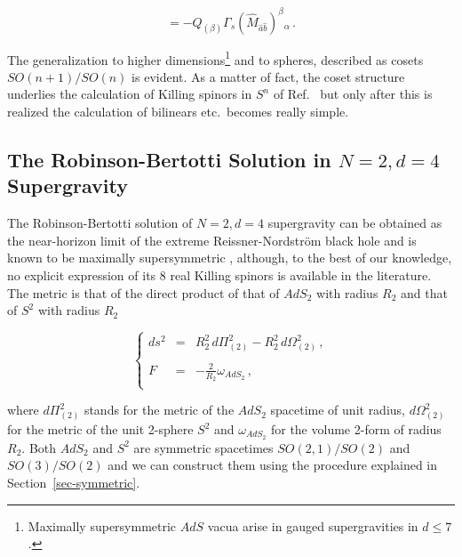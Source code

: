 \documentclass[12pt,a4paper]{article}
\begin{document}
\begin{equation}
[Q_{(\alpha)},\hat{M}_{\hat{a}\hat{b}}] = 
-Q_{(\beta)}\Gamma_{s}(\hat{M}_{\hat{a}\hat{b}})^{\beta}{}_{\alpha}\, .  
\end{equation}

The generalization to higher dimensions\footnote{Maximally
  supersymmetric $AdS$ vacua arise in gauged supergravities in $d\leq
  7$.} and to spheres, described as cosets $SO(n+1)/SO(n)$ is evident.
As a matter of fact, the coset structure underlies the calculation of
Killing spinors in $S^{n}$ of Ref.~\cite{Lu:1998nu} but only after
this is realized the calculation of bilinears etc.~becomes really
simple.


\subsection{The Robinson-Bertotti Solution in  $N=2,d=4$ Supergravity}
\label{sec-RB}

The Robinson-Bertotti solution of $N=2,d=4$ supergravity
\cite{kn:Rob,kn:Bert} can be obtained as the near-horizon limit of the
extreme Reissner-Nordstr\"om black hole and is known to be maximally
supersymmetric \cite{Gibbons:1984kp,Kallosh:1992gu}, although, to the
best of our knowledge, no explicit expression of its 8 real Killing
spinors is available in the literature. The metric is that of the
direct product of that of $AdS_{2}$ with radius $R_{2}$ and that of
$S^{2}$ with radius $R_{2}$

\begin{equation}
\label{eq:ads2xs2}
\left\{
  \begin{array}{rcl}
ds^{2} & = & R_{2}^{2}\,  d\Pi_{(2)}^{2} 
-R_{2}^{2}\, d\Omega_{(2)}^{2}\, , \\
& & \\
F & = & -\frac{2}{R_{2}}\omega_{AdS_{2}}\, ,\\
  \end{array}
\right.
\end{equation}

\noindent 
where $d\Pi_{(2)}^{2}$ stands for the metric of the $AdS_{2}$
spacetime of unit radius, $d\Omega_{(2)}^{2}$ for the metric of the
unit 2-sphere $S^{2}$ and $\omega_{AdS_{2}}$ for the volume 2-form of
radius $R_{2}$. Both $AdS_{2}$ and $S^{2}$ are symmetric spacetimes
$SO(2,1)/SO(2)$ and $SO(3)/SO(2)$ and we can construct them using the
procedure explained in Section~\ref{sec-symmetric}.
\end{document}
